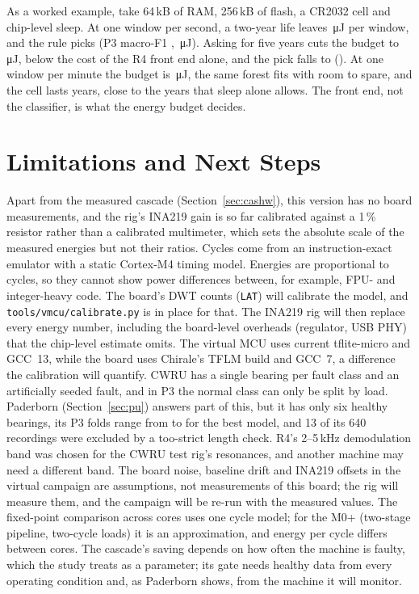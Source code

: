 As a worked example, take 64\,kB of RAM, 256\,kB of flash, a CR2032 cell and chip-level sleep. At one window per
second, a two-year life leaves \NumExTwoBudget{}\,\si{\micro J} per window, and the rule picks \NumExTwoModel{}
(P3 macro-F1 \NumExTwoFOne{}, \NumExTwoEnergy{}\,\si{\micro J}). Asking for five years cuts the budget to
\NumExFiveBudget{}\,\si{\micro J}, below the cost of the R4 front end alone, and the pick falls to \NumExFiveModel{}
(\NumExFiveFOne{}). At one window per minute the budget is \NumExMinBudget{}\,\si{\micro J}, the same forest fits
with room to spare, and the cell lasts \NumExMinLife{} years, close to the \NumExSleepLife{} years that sleep alone
allows. The front end, not the classifier, is what the energy budget decides.


\section{Limitations and Next Steps}
Apart from the measured cascade (Section~\ref{sec:cashw}), this version has no board measurements, and the
rig's INA219 gain is so far calibrated against a 1\,\% resistor rather than a calibrated multimeter, which sets
the absolute scale of the measured energies but not their ratios. Cycles come from an instruction-exact emulator with a static Cortex-M4
timing model. Energies are proportional to cycles, so they cannot show power differences between, for example, FPU-
and integer-heavy code. The board's DWT counts (\texttt{LAT}) will calibrate the model, and
\texttt{tools/vmcu/calibrate.py} is in place for that. The INA219 rig will then replace every energy number, including
the board-level overheads (regulator, USB PHY) that the chip-level estimate omits. The virtual MCU uses current
tflite-micro and GCC~13, while the board uses Chirale's TFLM build and GCC~7, a difference the calibration will
quantify. CWRU has a single bearing per fault class and an
artificially seeded fault, and in P3 the normal class can only be split by load. Paderborn (Section~\ref{sec:pu})
answers part of this, but it has only six healthy bearings, its P3 folds range from \NumPuPThreeFoldMin{} to
\NumPuPThreeFoldMax{} for the best model, and 13 of its 640 recordings were excluded by a too-strict length check. R4's 2--5\,kHz demodulation band was chosen for the CWRU test rig's resonances, and another
machine may need a different band. The board noise, baseline drift and INA219 offsets in the virtual campaign are
assumptions, not measurements of this board; the rig will measure them, and the campaign will be re-run with the
measured values. The fixed-point comparison across cores uses one cycle model; for the M0+ (two-stage pipeline, two-cycle
loads) it is an approximation, and energy per cycle differs between cores. The cascade's saving depends on how often
the machine is faulty, which the study treats as a parameter; its gate needs healthy data from every operating
condition and, as Paderborn shows, from the machine it will monitor.

